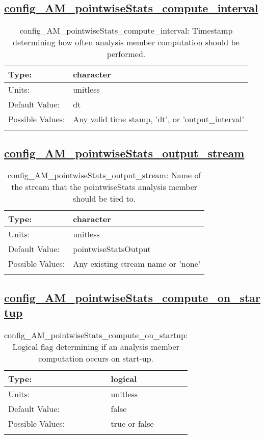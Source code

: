 \subsection[config\_AM\_pointwiseStats\_compute\_interval]{\hyperref[sec:nm_tab_AM_pointwiseStats]{config\_AM\_pointwiseStats\_compute\_interval}}
\label{subsec:nm_sec_config_AM_pointwiseStats_compute_interval}
\begin{center}
\begin{longtable}{| p{2.0in} || p{4.0in} |}
    \hline
    Type: & character \\
    \hline
    Units: & \si{unitless} \\
    \hline
    Default Value: & dt \\
    \hline
    Possible Values: & Any valid time stamp, 'dt', or 'output\_interval' \\
    \hline
    \caption{config\_AM\_pointwiseStats\_compute\_interval: Timestamp determining how often analysis member computation should be performed.}
\end{longtable}
\end{center}
\subsection[config\_AM\_pointwiseStats\_output\_stream]{\hyperref[sec:nm_tab_AM_pointwiseStats]{config\_AM\_pointwiseStats\_output\_stream}}
\label{subsec:nm_sec_config_AM_pointwiseStats_output_stream}
\begin{center}
\begin{longtable}{| p{2.0in} || p{4.0in} |}
    \hline
    Type: & character \\
    \hline
    Units: & \si{unitless} \\
    \hline
    Default Value: & pointwiseStatsOutput \\
    \hline
    Possible Values: & Any existing stream name or 'none' \\
    \hline
    \caption{config\_AM\_pointwiseStats\_output\_stream: Name of the stream that the pointwiseStats analysis member should be tied to.}
\end{longtable}
\end{center}
\subsection[config\_AM\_pointwiseStats\_compute\_on\_startup]{\hyperref[sec:nm_tab_AM_pointwiseStats]{config\_AM\_pointwiseStats\_compute\_on\_startup}}
\label{subsec:nm_sec_config_AM_pointwiseStats_compute_on_startup}
\begin{center}
\begin{longtable}{| p{2.0in} || p{4.0in} |}
    \hline
    Type: & logical \\
    \hline
    Units: & \si{unitless} \\
    \hline
    Default Value: & false \\
    \hline
    Possible Values: & true or false \\
    \hline
    \caption{config\_AM\_pointwiseStats\_compute\_on\_startup: Logical flag determining if an analysis member computation occurs on start-up.}
\end{longtable}
\end{center}
